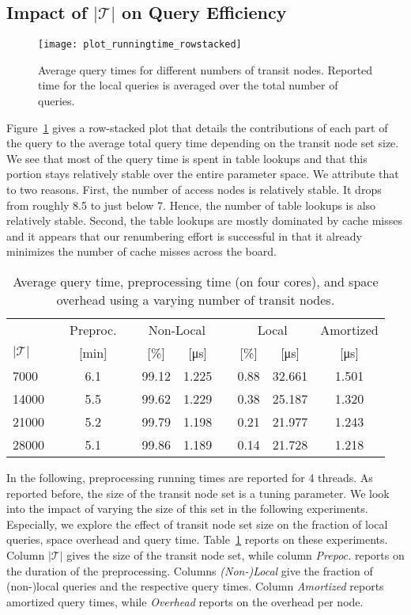 \documentclass{llncs}
\begin{document}
\subsection{Impact of $\vert\mathcal{T}\vert$ on Query Efficiency}
\begin{figure}[tb]
    \centering
    \texttt{[image: plot\_runningtime\_rowstacked]}
    \caption{Average query times for different numbers of transit nodes.  Reported time for the local queries is averaged over the total number of queries.}
    \label{fig:plotRunningTime}
\end{figure}
Figure~\ref{fig:plotRunningTime} gives a row-stacked plot that details the contributions of each part of the query to the average total query time depending on the transit node set size.
We see that most of the query time is spent in table lookups and that this portion stays relatively stable over the entire parameter space.
We attribute that to two reasons.
First, the number of access nodes is relatively stable.
It drops from roughly 8.5 to just below 7.
Hence, the number of table lookups is also relatively stable.
Second, the table lookups are mostly dominated by cache misses and it appears that our renumbering effort is successful in that it already minimizes the number of cache misses across the board.

\begin{table}[hbt]
\caption{Average query time, preprocessing time (on four cores), and space overhead using a varying number of transit nodes.}
\label{tab:overallInfo}
\centering
\begin{tabular}{lccccccccc}
\toprule 
	& & Preproc. & & \multicolumn{2}{c}{Non-Local} & & \multicolumn{2}{c}{Local} & Amortized \\\cline{5-6}\cline{8-9}
$\vert\mathcal{T}\vert$ & & [\si{\minute}] & & [\%] & [\si{\micro\second}] & & [\%] & [\si{\micro\second}] & [\si{\micro\second}] \\
\midrule
7000  & & 6.1 & & 99.12 & 1.225 & & 0.88 & 32.661 & 1.501 \\
14000 & & 5.5 & & 99.62 & 1.229 & & 0.38 & 25.187 & 1.320 \\
21000 & & 5.2 & & 99.79 & 1.198 & & 0.21 & 21.977 & 1.243 \\
28000 & & 5.1 & & 99.86 & 1.189 & & 0.14 & 21.728 & 1.218 \\
\bottomrule 
\end{tabular}
\end{table}

In the following, preprocessing running times are reported for 4 threads.
As reported before, the size of the transit node set is a tuning parameter.
We look into the impact of varying the size of this set in the following experiments.
Especially, we explore the effect of transit node set size on the fraction of local queries, space overhead and query time.
Table~\ref{tab:overallInfo} reports on these experiments. 
Column $\vert\mathcal{T}\vert$ gives the size of the transit node set, while column \emph{Prepoc.} reports on the duration of the preprocessing.
Columns \emph{(Non-)Local} give the fraction of (non-)local queries and the respective query times.
Column \emph{Amortized} reports amortized query times, while \emph{Overhead} reports on the overhead per node.
\end{document}
